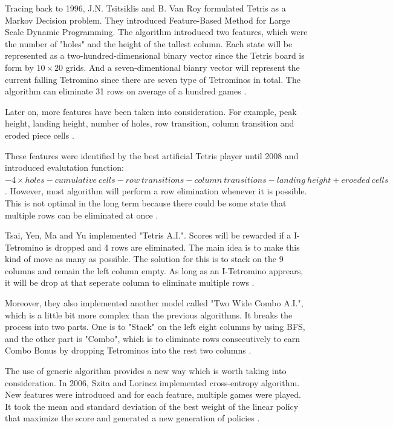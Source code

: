 \documentclass[letterpaper]{article} %
\begin{document}
Tracing back to 1996, J.N. Tsitsiklis and B. Van Roy formulated Tetris as a Markov Decision problem. They introduced Feature-Based Method for Large Scale Dynamic Programming. The algorithm introduced two features, which were the number of "holes" and the height of the tallest column. Each state will be represented as a two-hundred-dimensional binary vector since the Tetris board is form by $10 \times 20$ grids. And a seven-dimentional bianry vector will represent the current falling Tetromino since there are seven type of Tetrominos in total. The algorithm can eliminate 31 rows on average of a hundred games \cite{TV96}.

Later on, more features have been taken into consideration. For example, peak height, landing height, number of holes, row transition, column transition and eroded piece cells \cite{WCWT}. 

These features were identified by the best artificial Tetris player until 2008 and introduced evalutation function: 
$-4 \times holes - cumulative\ cells - row\ transitions - column\ transitions - landing\ height + eroeded\ cells$ \cite{SO19}. However, most algorithm will perform a row elimination whenever it is possible. This is not optimal in the long term because there could be some state that multiple rows can be eliminated at once \cite{WCWT}. 

Tsai, Yen, Ma and Yu implemented "Tetris A.I.". Scores will be rewarded if a I-Tetromino is dropped and 4 rows are eliminated. The main idea is to make this kind of move as many as possible. The solution for this is to stack on the 9 columns and remain the left column empty. As long as an I-Tetromino apprears, it will be drop at that seperate column to eliminate multiple rows \cite{WCWT}.

Moreover, they also implemented another model called "Two Wide Combo A.I.", which is a little bit more complex than the previous algorithms. It breaks the process into two parts. One is to "Stack" on the left eight columns by using BFS, and the other part is "Combo", which is to eliminate rows consecutively to earn Combo Bonus by dropping Tetrominos into the rest two columns \cite{WCWT}.

The use of generic algorithm provides a new way which is worth taking into consideration. In 2006, Szita and Lorincz implemented cross-entropy algorithm. New features were introduced and for each feature, multiple games were played. It took the mean and standard deviation of the best weight of the linear policy that maximize the score and generated a new generation of policies \cite{SO19}.
\end{document}
